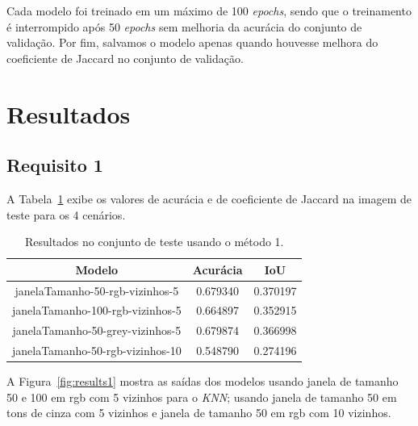 \documentclass{bmvc2k}
\begin{document}
Cada modelo foi treinado em um máximo de 100 \textit{epochs}, sendo que o treinamento é interrompido após 50 \textit{epochs} sem melhoria da acurácia do conjunto de validação. Por fim, salvamos o modelo apenas quando houvesse melhora do coeficiente de Jaccard no conjunto de validação.

\section{Resultados}
\label{sec:res}

\subsection{Requisito 1}
\label{res:req1}
A Tabela~\ref{tab:results1} exibe os valores de acurácia e de coeficiente de Jaccard na imagem de teste para os 4 cenários.

\begin{table}[htb]
    \centering
    \begin{tabular}{c|c|c}
        Modelo & Acurácia & IoU \\
        \hline
        janelaTamanho-50-rgb-vizinhos-5 & 0.679340 & 0.370197 \\
        janelaTamanho-100-rgb-vizinhos-5 & 0.664897 & 0.352915 \\
        janelaTamanho-50-grey-vizinhos-5 & 0.679874 & 0.366998 \\ 
        janelaTamanho-50-rgb-vizinhos-10 & 0.548790 & 0.274196 \\
    \end{tabular}
    \caption{Resultados no conjunto de teste usando o método 1.}
    \label{tab:results1}
\end{table}

A Figura~\ref{fig:results1} mostra as saídas dos modelos usando janela de tamanho 50 e 100 em rgb com 5 vizinhos para o \textit{KNN}; usando janela de tamanho 50 em tons de cinza com 5 vizinhos e janela de tamanho 50 em rgb com 10 vizinhos.
\end{document}
